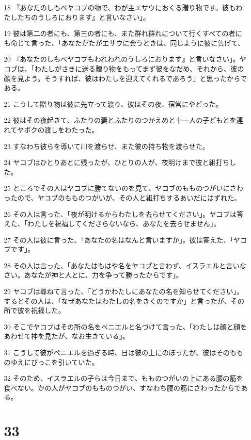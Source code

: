 \par 18 『あなたのしもべヤコブの物で、わが主エサウにおくる贈り物です。彼もわたしたちのうしろにおります』と言いなさい」。
\par 19 彼は第二の者にも、第三の者にも、また群れ群れについて行くすべての者にも命じて言った、「あなたがたがエサウに会うときは、同じように彼に告げて、
\par 20 『あなたのしもべヤコブもわれわれのうしろにおります』と言いなさい」。ヤコブは、「わたしがさきに送る贈り物をもってまず彼をなだめ、それから、彼の顔を見よう。そうすれば、彼はわたしを迎えてくれるであろう」と思ったからである。
\par 21 こうして贈り物は彼に先立って渡り、彼はその夜、宿営にやどった。
\par 22 彼はその夜起きて、ふたりの妻とふたりのつかえめと十一人の子どもとを連れてヤボクの渡しをわたった。
\par 23 すなわち彼らを導いて川を渡らせ、また彼の持ち物を渡らせた。
\par 24 ヤコブはひとりあとに残ったが、ひとりの人が、夜明けまで彼と組打ちした。
\par 25 ところでその人はヤコブに勝てないのを見て、ヤコブのもものつがいにさわったので、ヤコブのもものつがいが、その人と組打ちするあいだにはずれた。
\par 26 その人は言った、「夜が明けるからわたしを去らせてください」。ヤコブは答えた、「わたしを祝福してくださらないなら、あなたを去らせません」。
\par 27 その人は彼に言った、「あなたの名はなんと言いますか」。彼は答えた、「ヤコブです」。
\par 28 その人は言った、「あなたはもはや名をヤコブと言わず、イスラエルと言いなさい。あなたが神と人とに、力を争って勝ったからです」。
\par 29 ヤコブは尋ねて言った、「どうかわたしにあなたの名を知らせてください」。するとその人は、「なぜあなたはわたしの名をきくのですか」と言ったが、その所で彼を祝福した。
\par 30 そこでヤコブはその所の名をペニエルと名づけて言った、「わたしは顔と顔をあわせて神を見たが、なお生きている」。
\par 31 こうして彼がペニエルを過ぎる時、日は彼の上にのぼったが、彼はそのもものゆえにびっこを引いていた。
\par 32 そのため、イスラエルの子らは今日まで、もものつがいの上にある腰の筋を食べない。かの人がヤコブのもものつがい、すなわち腰の筋にさわったからである。

\chapter{33}

